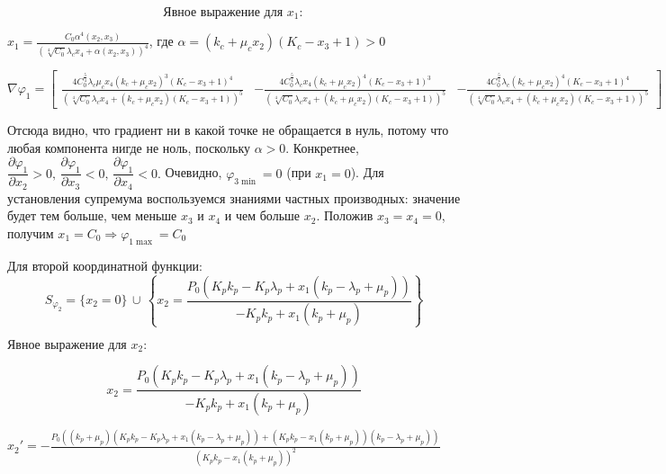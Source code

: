 \documentclass[11pt]{article}
\begin{document}
    $$ \text{Явное выражение для } x_1: $$

    
    $ x_1 = \frac{C_{0} \alpha^{4}{\left(x_{2},x_{3} \right)}}{\left(\sqrt[4]{C_{0}} \lambda_{c} x_{4} + \alpha{\left(x_{2},x_{3} \right)}\right)^{4}}$, где $\alpha = \left(k_{c} + \mu_{c} x_{2}\right) \left(K_{c} - x_{3} + 1\right) > 0$

    
    $\nabla \varphi_1 = \left[\begin{matrix}\frac{4 C_{0}^{\frac{5}{4}} \lambda_{c} \mu_{c} x_{4} \left(k_{c} + \mu_{c} x_{2}\right)^{3} \left(K_{c} - x_{3} + 1\right)^{4}}{\left(\sqrt[4]{C_{0}} \lambda_{c} x_{4} + \left(k_{c} + \mu_{c} x_{2}\right) \left(K_{c} - x_{3} + 1\right)\right)^{5}} & - \frac{4 C_{0}^{\frac{5}{4}} \lambda_{c} x_{4} \left(k_{c} + \mu_{c} x_{2}\right)^{4} \left(K_{c} - x_{3} + 1\right)^{3}}{\left(\sqrt[4]{C_{0}} \lambda_{c} x_{4} + \left(k_{c} + \mu_{c} x_{2}\right) \left(K_{c} - x_{3} + 1\right)\right)^{5}} & - \frac{4 C_{0}^{\frac{5}{4}} \lambda_{c} \left(k_{c} + \mu_{c} x_{2}\right)^{4} \left(K_{c} - x_{3} + 1\right)^{4}}{\left(\sqrt[4]{C_{0}} \lambda_{c} x_{4} + \left(k_{c} + \mu_{c} x_{2}\right) \left(K_{c} - x_{3} + 1\right)\right)^{5}}\end{matrix}\right] $

    
    Отсюда видно, что градиент ни в какой точке не обращается в нуль, потому
что любая компонента нигде не ноль, поскольку \(\alpha > 0.\)
Конкретнее,
\(\dfrac{\partial \varphi_1}{\partial x_2} > 0,\,  \dfrac{\partial \varphi_1}{\partial x_3} < 0,\,  \dfrac{\partial \varphi_1}{\partial x_4} < 0.\)
Очевидно, \(\varphi_{3 \min} = 0\) (при \(x_1 = 0\)). Для установления
супремума воспользуемся знаниями частных производных: значение будет тем
больше, чем меньше \(x_3\) и \(x_4\) и чем больше \(x_2\). Положив
\(x_3 = x_4 = 0\), получим
\(x_1 = C_0 \Rightarrow \varphi_{1 \max} = C_0\)

    Для второй координатной функции:
\[ S_{\varphi_2} = \{ x_2 = 0\}\, \cup \, 
\left\{ x_2 = 
\dfrac{P_{0} \left(K_{p} k_{p} - K_{p} \lambda_{p} + x_{1} \left(k_{p} - \lambda_{p} + \mu_{p}\right)\right)}{- K_{p} k_{p} + x_{1} \left(k_{p} + \mu_{p}\right)}
\right\} \]

    $ \text{Явное выражение для } x_2: $

    
    $$ x_2 = \frac{P_{0} \left(K_{p} k_{p} - K_{p} \lambda_{p} + x_{1} \left(k_{p} - \lambda_{p} + \mu_{p}\right)\right)}{- K_{p} k_{p} + x_{1} \left(k_{p} + \mu_{p}\right)}$$

    
    $ x_2' = - \frac{P_{0} \left(\left(k_{p} + \mu_{p}\right) \left(K_{p} k_{p} - K_{p} \lambda_{p} + x_{1} \left(k_{p} - \lambda_{p} + \mu_{p}\right)\right) + \left(K_{p} k_{p} - x_{1} \left(k_{p} + \mu_{p}\right)\right) \left(k_{p} - \lambda_{p} + \mu_{p}\right)\right)}{\left(K_{p} k_{p} - x_{1} \left(k_{p} + \mu_{p}\right)\right)^{2}} $
\end{document}

